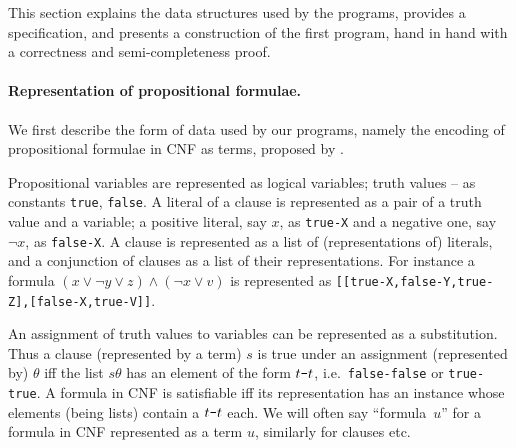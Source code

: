 \documentclass{tlp}
\newcommand*{\mydash}{{\mbox{\tt-}}}
\begin{document}
This section explains the data structures used by the programs, 
provides a specification, 
and presents a construction of the first program, hand in hand with 
a correctness and semi-completeness proof.








\paragraph{Representation of propositional formulae.}

We first describe the form of data used by our programs, namely
the encoding of propositional formulae in CNF as terms,
proposed by \cite{howe.king.tcs-shorter}.

Propositional variables are represented as logical variables;
truth values -- as constants {\tt true}, {\tt false}.
A literal of a clause is represented as a pair of a truth value and a variable;
a positive literal, say $x$, as {\tt true-X}
and a negative one, say $\neg x$, as  {\tt false-X}.
A clause is represented as a list of (representations of) literals,
and a conjunction of clauses as a list of their representations.
For instance a formula
$(x\lor\neg y\lor z)\land(\neg x\lor v)$ is represented as 
{\tt[[true-X,false-Y,true-Z],[false-X,true-V]]}.

An assignment of truth values to variables can be represented as a substitution.
Thus a clause (represented by a term) $s$ is true under an assignment (represented
by) $\theta$ iff the list $s\theta$ 
has an element of the form  $t\mydash t$, i.e.\ 
{\tt false-false} or {\tt true-true}.  A formula in CNF is satisfiable
iff
its representation has an instance whose
elements (being lists) contain a  $t\mydash t$ each.
We will often say ``formula~$u$\/'' for a formula in CNF represented as a
term $u$, similarly for clauses etc.
\end{document}
